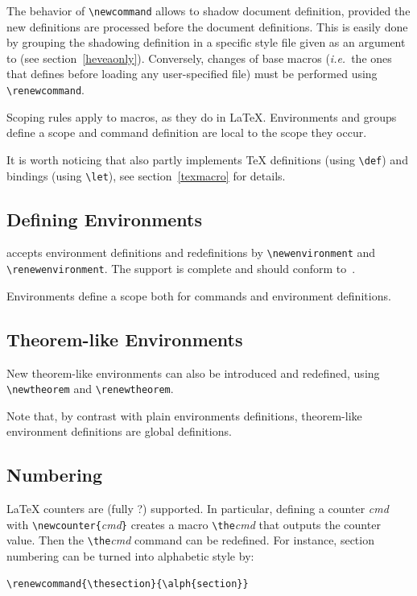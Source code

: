 The behavior of \verb+\newcommand+ allows to shadow document
definition, provided the new definitions are processed before the
document definitions.
This is easily done by grouping the shadowing definition  in a
specific style file given as an argument to \hevea{} (see section~\ref{heveaonly}).
Conversely, changes of base macros (\emph{i.e.}\ the ones that \hevea{}
defines before loading any user-specified file) must be performed
using \verb+\renewcommand+.



Scoping rules apply to macros, as they do in \LaTeX{}.
Environments and groups define a scope and command definition
are local to the scope they occur.

It is worth noticing that \hevea{} also partly implements \TeX{} definitions
(using \verb+\def+) and bindings (using \verb+\let+), see
section~\ref{texmacro} for details.


\subsection{Defining Environments}
\hevea{} accepts environment definitions and redefinitions
by \verb+\newenvironment+ and \verb+\renewenvironment+.
The support is complete and should conform
to~\cite[Sections~C.8.2]{latex}.


Environments define a scope both for commands and environment
definitions.


\subsection{Theorem-like Environments}
New theorem-like environments can also be introduced and redefined,
using \verb+\newtheorem+ and \verb+\renewtheorem+.

Note that, by contrast with plain environments definitions,
theorem-like environment definitions are global definitions.

\subsection{Numbering}
\LaTeX{} counters are (fully ?) supported.
In particular, defining a counter \textit{cmd} with
\verb+\newcounter{+\textit{cmd}\verb+}+ creates a macro
\verb+\the+\textit{cmd} that outputs the counter value.
Then the \verb+\the+\textit{cmd} command can be redefined.
For instance, section numbering can be turned into alphabetic style by:
\begin{verbatim}
\renewcommand{\thesection}{\alph{section}}
\end{verbatim}

